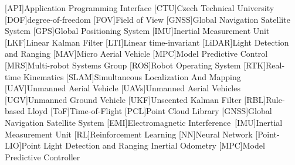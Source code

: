 
\begin{acronym}
  [API]{Application Programming Interface}
  [CTU]{Czech Technical University}
  [DOF]{degree-of-freedom}
  [FOV]{Field of View}
  [GNSS]{Global Navigation Satellite System}
  [GPS]{Global Positioning System}
  [IMU]{Inertial Measurement Unit}
  [LKF]{Linear Kalman Filter}
  [LTI]{Linear time-invariant}
  [LiDAR]{Light Detection and Ranging}
  [MAV]{Micro Aerial Vehicle}
  [MPC]{Model Predictive Control}
  [MRS]{Multi-robot Systems Group}
  [ROS]{Robot Operating System}
  [RTK]{Real-time Kinematics}
  [SLAM]{Simultaneous Localization And Mapping}
  [UAV]{Unmanned Aerial Vehicle}
  [UAVs]{Unmanned Aerial Vehicles}
  [UGV]{Unmanned Ground Vehicle}
  [UKF]{Unscented Kalman Filter}
  [RBL]{Rule-based Lloyd}
  [ToF]{Time-of-Flight}
  [PCL]{Point Cloud Library}
  [GNSS]{Global Navigation Satellite System}
  [EMI]{Electromagnetic Interference}\
  [IMU]{Inertial Measurement Unit}
  [RL]{Reinforcement Learning}
  [NN]{Neural Network}
  [Point-LIO]{Point Light Detection and Ranging Inertial Odometry}
  \acro{MPC}[MPC]{Model Predictive Controller}
\end{acronym}

